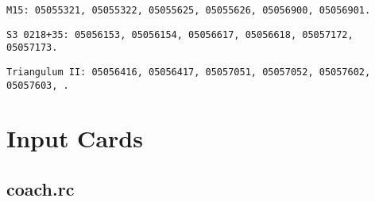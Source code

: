 \texttt{M15: 05055321, 05055322, 05055625, 05055626, 05056900, 05056901. }

\texttt{S3 0218+35: 05056153, 05056154, 05056617, 05056618, 05057172, 05057173.}

\texttt{Triangulum II: 05056416, 05056417, 05057051, 05057052, 05057602, 05057603, .}

\newpage


\section{Input Cards}
\label{sec:input_cards}

\subsection*{coach.rc}

